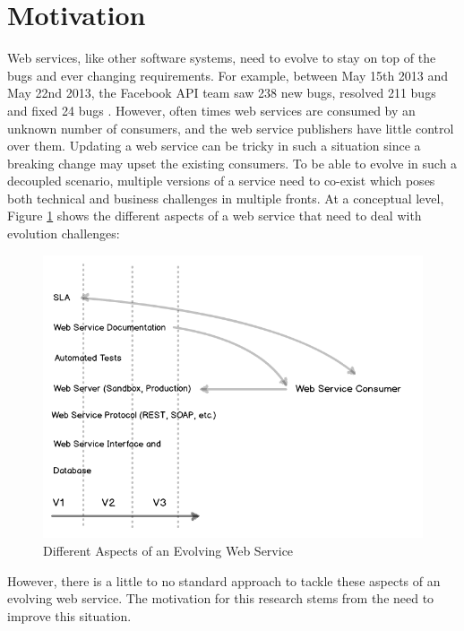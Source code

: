 \documentclass[runningheads,a4paper]{llncs}
\begin{document}
\section{Motivation} %
\label{sec:motivation}
Web services, like other software systems, need to evolve to stay on top of the bugs and ever changing requirements. For example, between May 15th 2013 and May 22nd 2013, the Facebook API team saw 238 new bugs, resolved 211 bugs and fixed 24 bugs \cite{facebook_release_note}. However, often times web services are consumed by an unknown number of consumers, and the web service publishers have little control over them. Updating a web service can be tricky in such a situation since a breaking change may upset the existing consumers. To be able to evolve in such a decoupled scenario, multiple versions of a service need to co-exist which poses both technical and business challenges in multiple fronts. At a conceptual level, Figure \ref{fig:web_service_layers} shows the different aspects of a web service that need to deal with evolution challenges:


\begin{figure}[ht]
  \centering
  \includegraphics[width=\textwidth]{web_service_layers.png}
    \caption{Different Aspects of an Evolving Web Service}
  \label{fig:web_service_layers}
\end{figure}

However, there is a little to no standard approach to tackle these aspects of an evolving web service. The motivation for this research stems from the need to improve this situation.

\end{document}
